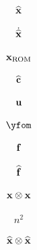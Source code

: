\documentclass[12 pt]{article}
\begin{document}
\begin{align*}
    \widehat{\mathbf{x}}
\end{align*}

\begin{align*}
    \dot{\widehat{\mathbf{x}}}
\end{align*}

\begin{align*}
    \mathbf{x}_\textrm{ROM}
\end{align*}

\begin{align*}
    \widehat{\mathbf{c}}
\end{align*}

\begin{align*}
    \mathbf{u}
\end{align*}

\begin{align*}
    \yfom
\end{align*}

\begin{align*}
    \mathbf{f}
\end{align*}

\begin{align*}
    \widehat{\mathbf{f}}
\end{align*}

\begin{align*}
    \mathbf{x} \otimes \mathbf{x}
\end{align*}

\begin{align*}
    n^2
\end{align*}

\begin{align*}
    \widehat{\mathbf{x}} \otimes \widehat{\mathbf{x}}
\end{align*}
\end{document}

